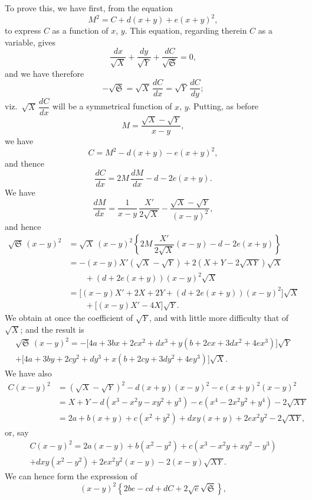 \documentclass[11pt]{article}
\begin{document}
To prove this, we have first, from the equation
\[
M^2 = C + d(x + y) + e(x + y)^2,
\]
to express $C$ as a function of $x$, $y$. This equation, regarding therein $C$ as a variable, gives
\[
\dfrac{dx}{\sqrt{X}} + \dfrac{dy}{\sqrt{Y}} + \dfrac{dC}{\sqrt{\mathfrak{S}}} = 0,
\]
and we have therefore
\[
-\sqrt{\mathfrak{S}} = \sqrt{X}\,\dfrac{dC}{dx} = \sqrt{Y}\,\dfrac{dC}{dy};
\]
viz.\ $\sqrt{X}\,\dfrac{dC}{dx}$ will be a symmetrical function of $x$, $y$. Putting, as before
\[
M = \dfrac{\sqrt{X} - \sqrt{Y}}{x - y},
\]
we have
\[
C = M^2 - d(x + y) - e(x + y)^2,
\]
and thence
\[
\dfrac{dC}{dx} = 2M\,\dfrac{dM}{dx} - d - 2e(x + y).
\]
We have
\[
\dfrac{dM}{dx} = \dfrac{1}{x - y}\,\dfrac{X'}{2\sqrt{X}} - \dfrac{\sqrt{X} - \sqrt{Y}}{(x - y)^2},
\]
and hence
\begin{align*}
\sqrt{\mathfrak{S}}\,(x - y)^2 &= \sqrt{X}\,(x - y)^2\!\left\{2M\,\dfrac{X'}{2\sqrt{X}}(x-y) - d - 2e(x + y)\right\}\\
&= -(x - y)X'(\sqrt{X} - \sqrt{Y}) + 2(X + Y - 2\sqrt{XY})\sqrt{X}\\
&\qquad + (d + 2e(x + y))(x - y)^2\sqrt{X}\\
&= \bigl[(x - y)X' + 2X + 2Y + (d + 2e(x + y))(x - y)^2\bigr]\sqrt{X}\\
&\qquad + \bigl[(x - y)X' - 4X\bigr]\sqrt{Y}.
\end{align*}
We obtain at once the coefficient of $\sqrt{Y}$, and with little more difficulty that of $\sqrt{X}$; and the result is
\begin{multline*}
\sqrt{\mathfrak{S}}\,(x - y)^2 = -\bigl[4a + 3bx + 2cx^2 + dx^3 + y(b + 2cx + 3dx^2 + 4ex^3)\bigr]\sqrt{Y}\\
+ \bigl[4a + 3by + 2cy^2 + dy^3 + x(b + 2cy + 3dy^2 + 4ey^3)\bigr]\sqrt{X}.
\end{multline*}
We have also
\begin{align*}
C(x - y)^2 &= (\sqrt{X} - \sqrt{Y})^2 - d(x + y)(x - y)^2 - e(x + y)^2(x - y)^2\\
&= X + Y - d(x^3 - x^2 y - xy^2 + y^3) - e(x^4 - 2x^2 y^2 + y^4) - 2\sqrt{XY}\\
&= 2a + b(x + y) + c(x^2 + y^2) + dxy(x + y) + 2ex^2 y^2 - 2\sqrt{XY},
\end{align*}
or, say
\begin{multline*}
C(x - y)^2 = 2a(x - y) + b(x^2 - y^2) + c(x^3 - x^2 y + xy^2 - y^3)\\
+ dxy(x^2 - y^2) + 2ex^2 y^2(x - y) - 2(x - y)\sqrt{XY}.
\end{multline*}
We can hence form the expression of
\[
(x - y)^2\!\left\{2be - cd + dC + 2\sqrt{e}\sqrt{\mathfrak{S}}\right\},
\]
\end{document}
